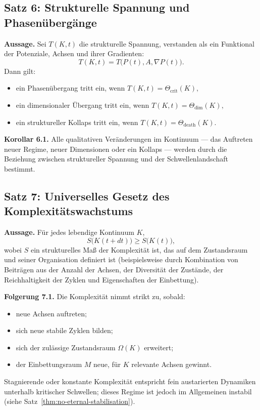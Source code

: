 \subsection{Satz 6: Strukturelle Spannung und Phasenübergänge}

\textbf{Aussage.}
Sei \(T(K,t)\) die strukturelle Spannung, verstanden als ein Funktional der Potenziale, Achsen und ihrer Gradienten:
\[
    T(K,t) = T\big(P(t),A,\nabla P(t)\big).
\]
Dann gilt:
\begin{itemize}
    \item ein Phasenübergang tritt ein, wenn
          \(
              T(K,t) = \Theta_{\mathrm{crit}}(K),
          \)
    \item ein dimensionaler Übergang tritt ein, wenn
          \(
              T(K,t) = \Theta_{\mathrm{dim}}(K),
          \)
    \item ein struktureller Kollaps tritt ein, wenn
          \(
              T(K,t) = \Theta_{\mathrm{death}}(K).
          \)
\end{itemize}

\textbf{Korollar 6.1.}
Alle qualitativen Veränderungen im Kontinuum --- das Auftreten neuer Regime, neuer Dimensionen oder ein Kollaps --- werden durch die Beziehung zwischen struktureller Spannung und der Schwellenlandschaft bestimmt.

\subsection{Satz 7: Universelles Gesetz des Komplexitätswachstums}

\textbf{Aussage.}
Für jedes lebendige Kontinuum \(K\),
\[
    S\big(K(t+dt)\big) \ge S\big(K(t)\big),
\]
wobei \(S\) ein strukturelles Maß der Komplexität ist, das auf dem Zustandsraum und seiner Organisation definiert ist (beispielsweise durch Kombination von Beiträgen aus der Anzahl der Achsen, der Diversität der Zustände, der Reichhaltigkeit der Zyklen und Eigenschaften der Einbettung).

\textbf{Folgerung 7.1.}
Die Komplexität nimmt strikt zu, sobald:
\begin{itemize}
    \item neue Achsen auftreten;
    \item sich neue stabile Zyklen bilden;
    \item sich der zulässige Zustandsraum \(\Omega(K)\) erweitert;
    \item der Einbettungsraum \(M\) neue, für \(K\) relevante Achsen gewinnt.
\end{itemize}
Stagnierende oder konstante Komplexität entspricht fein austarierten Dynamiken unterhalb kritischer Schwellen; dieses Regime ist jedoch im Allgemeinen instabil (siehe Satz~\ref{thm:no-eternal-stabilisation}).

